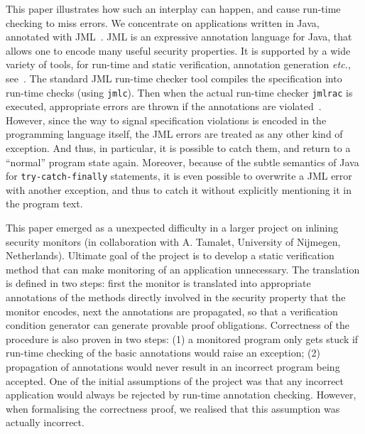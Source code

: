 \documentclass[]{llncs}
\begin{document}
This paper illustrates how such an interplay can happen, and cause
run-time checking to miss errors. We concentrate on applications
written in Java, annotated with JML~\cite{LeavensBR99}. JML is an
expressive annotation language for Java, that allows one to encode
many useful security properties. It is supported by a wide variety of
tools, for run-time and static verification, annotation generation
\emph{etc.}, see~\cite{BurdyCCEKLLP03}. The standard JML run-time
checker tool compiles the specification into run-time checks (using
\texttt{jmlc}). Then when the actual run-time checker \texttt{jmlrac}
is executed, appropriate errors are thrown if the annotations are
violated~\cite{Cheon03}. However, since the way to signal
specification violations is encoded in the programming language
itself, the JML errors are treated as any other kind of exception. And
thus, in particular, it is possible to catch them, and return to a
``normal'' program state again. Moreover, because of the subtle
semantics of Java for
\texttt{try-catch-finally} statements, it is even possible to
overwrite a JML error with another exception, and thus to catch it
without explicitly mentioning it in the program text.

This paper emerged as a unexpected difficulty in a larger project on
inlining security monitors (in collaboration with A. Tamalet,
University of Nijmegen, Netherlands). Ultimate goal of the project is
to develop a static verification method that can make monitoring of an
application unnecessary. The translation is defined in two steps:
first the monitor is translated into appropriate annotations of the
methods directly involved in the security property that the monitor
encodes, next the annotations are propagated, so that a verification
condition generator can generate provable proof
obligations. Correctness of the procedure is also proven in two steps:
(1) a monitored program only gets stuck if run-time checking of the
basic annotations would raise an exception; (2) propagation of
annotations would never result in an incorrect program being
accepted. One of the initial assumptions of the project was that any
incorrect application would always be rejected by run-time annotation
checking. However, when formalising the correctness proof, we realised
that this assumption was actually incorrect.
\end{document}
